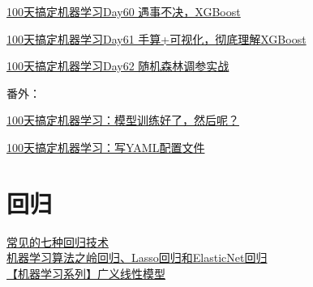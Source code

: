 \documentclass[
]{book}
\begin{document}
\href{https://mp.weixin.qq.com/s?__biz=MzA4MjYwMTc5Nw==\&mid=2648948540\&idx=1\&sn=9b7101248effcf5e00aee7a28edb4383\&chksm=87942d16b0e3a400567fc26f81d78c04a74a4ab4c45f06cab5dfd19ac6cb385c874c374b73ad\&token=211056560\&lang=zh_CN\&scene=21\#wechat_redirect}{100天搞定机器学习\textbar Day60 遇事不决，XGBoost}

\href{https://mp.weixin.qq.com/s?__biz=MzA4MjYwMTc5Nw==\&mid=2648949016\&idx=2\&sn=e07df5503772e08f96a41845a36c8575\&chksm=87945332b0e3da24b507f4b39f1889dae196a699a0b8e92f8fd50d498876f66e0b4803273804\&token=211056560\&lang=zh_CN\&scene=21\#wechat_redirect}{100天搞定机器学习\textbar Day61 手算+可视化，彻底理解XGBoost}

\href{https://mp.weixin.qq.com/s?__biz=MzA4MjYwMTc5Nw==\&mid=2648934632\&idx=3\&sn=22fb617d5885be57889250d839221f27\&chksm=87941ac2b0e393d451917c328f3204737856a28263f8fe7258dc7b8eff7a38a9f94e580fff9c\&scene=21\&cur_album_id=1340752070114328576\#wechat_redirect}{100天搞定机器学习\textbar Day62 随机森林调参实战}

番外：

\href{http://mp.weixin.qq.com/s?__biz=MzA4MjYwMTc5Nw==\&mid=2648950326\&idx=2\&sn=5774aa73de4d0558a2d00de39dee7bd6\&chksm=8794541cb0e3dd0aad7963dc54cc99b3a677e5bbb317e106d4b0a611fd08df19daf1dec471c0\&scene=21\#wechat_redirect}{100天搞定机器学习：模型训练好了，然后呢？}

\href{http://mp.weixin.qq.com/s?__biz=MzA4MjYwMTc5Nw==\&mid=2648950329\&idx=1\&sn=4ed063790e872f149487fac5e5e8b826\&chksm=87945413b0e3dd05c2b9f677983a60c8c693fa2faf894894194896912c95dcbf6d50ededf6a6\&scene=21\#wechat_redirect}{100天搞定机器学习：写YAML配置文件}

\hypertarget{ux56deux5f52}{%
\section{回归}\label{ux56deux5f52}}

\href{https://mp.weixin.qq.com/s?__biz=MzA4MjYwMTc5Nw==\&mid=2648931029\&idx=1\&sn=9e1bae267e5123819d4e50cc0a32e46a\&chksm=8794e8ffb0e361e9bd6b2787f9eb1d99ebc9fd106082e3d4dc544ad970349fc049ed9da5be2e\&token=2004915986\&lang=en_US\#rd}{常见的七种回归技术}\\
\href{https://mp.weixin.qq.com/s?__biz=MzA4MjYwMTc5Nw==\&mid=2648930965\&idx=1\&sn=28093bf9604138c5090959f924267c75\&chksm=8794e8bfb0e361a94ac9d3246c81a308ac7d57704db769ee6729653bbd6eec23acbf4cb7565e\&token=2004915986\&lang=en_US\#rd}{机器学习算法之岭回归、Lasso回归和ElasticNet回归}\\
\href{https://mp.weixin.qq.com/s?__biz=MzA4MjYwMTc5Nw==\&mid=2648929533\&idx=1\&sn=5f50bbc0bbebb8254a7161417a5cc842\&chksm=8794e6d7b0e36fc118605bd15fa1f0adf7528969c27e122d2fae1b29bff430cd300e872fcd30\&token=2004915986\&lang=en_US\#rd}{【机器学习系列】广义线性模型}
\end{document}
